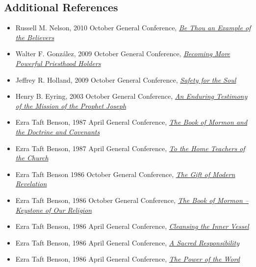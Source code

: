 \documentclass[12pt]{report}
\begin{document}
\subsection{Additional References\label{intro:references6}}
\begin{itemize}
\item Russell M. Nelson, 2010 October General Conference, \href{https://www.lds.org/general-conference/2010/10/be-thou-an-example-of-the-believers?lang=eng}{\emph{Be Thou an Example of the Believers}}
\item Walter F. Gonz\'alez, 2009 October General Conference, \href{https://www.lds.org/general-conference/2009/10/becoming-more-powerful-priesthood-holders?lang=eng}{\emph{Becoming More Powerful Priesthood Holders}}
\item Jeffrey R. Holland, 2009 October General Conference, \href{https://www.lds.org/general-conference/2009/10/safety-for-the-soul?lang=eng}{\emph{Safety for the Soul}}
\item Henry B. Eyring, 2003 October General Conference, \href{https://www.lds.org/general-conference/2003/10/an-enduring-testimony-of-the-mission-of-the-prophet-joseph?lang=eng}{\emph{An Enduring Testimony of the Mission of the Prophet Joseph}}
\item Ezra Taft Benson, 1987 April General Conference, \href{https://www.lds.org/general-conference/1987/04/the-book-of-mormon-and-the-doctrine-and-covenants?lang=eng}{\emph{The Book of Mormon and the Doctrine and Covenants}}
\item Ezra Taft Benson, 1987 April General Conference, \href{https://www.lds.org/general-conference/1987/04/to-the-home-teachers-of-the-church?lang=eng}{\emph{To the Home Teachers of the Church}}
\item Ezra Taft Benson 1986 October General Conference, \href{https://www.lds.org/general-conference/1986/10/the-gift-of-modern-revelation?lang=eng}{\emph{The Gift of Modern Revelation}}
\item Ezra Taft Benson, 1986 October General Conference, \href{https://www.lds.org/general-conference/1986/10/the-book-of-mormon-keystone-of-our-religion?lang=eng}{\emph{The Book of Mormon -- Keystone of Our Religion}}
\item Ezra Taft Benson, 1986 April General Conference, \href{https://www.lds.org/general-conference/1986/04/cleansing-the-inner-vessel?lang=eng}{\emph{Cleansing the Inner Vessel}}
\item Ezra Taft Benson, 1986 April General Conference, \href{https://www.lds.org/general-conference/1986/04/a-sacred-responsibility?lang=eng}{\emph{A Sacred Responsibility}}
\item Ezra Taft Benson, 1986 April General Conference, \href{https://www.lds.org/general-conference/1986/04/the-power-of-the-word?lang=eng}{\emph{The Power of the Word}}
\end{itemize}
\end{document}
